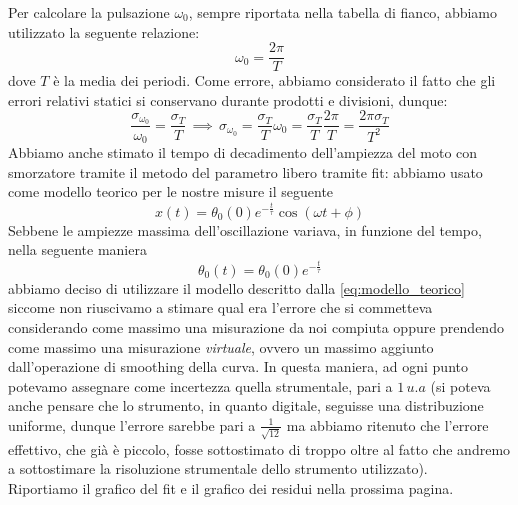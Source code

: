 \documentclass{article}
\begin{document}
\noindent Per calcolare la pulsazione $\omega_0$, sempre riportata nella tabella di fianco, abbiamo utilizzato la seguente relazione:
\begin{equation}
	\omega_0 = \frac{2\pi}{T}
\end{equation}
dove $T$ è la media dei periodi. Come errore, abbiamo considerato il fatto che gli errori relativi statici si conservano durante prodotti e divisioni, dunque:
\begin{equation*}
	\frac{\sigma_{\omega_0}}{\omega_0} = \frac{\sigma_{T}}{T} \, \implies \, \sigma_{\omega_0} = \frac{\sigma_T}{T} \omega_0 = \frac{\sigma_T}{T} \frac{2\pi}{T} = \frac{2\pi \sigma_T}{T^2}
\end{equation*}
Abbiamo anche stimato il tempo di decadimento dell'ampiezza del moto con smorzatore tramite il metodo del parametro libero tramite fit: abbiamo usato come modello teorico per le nostre misure il seguente
\begin{equation}
	x(t) = \theta_0 (0)e^{-\frac{t}{\tau}}\cos{\left( \omega t + \phi \right) }
	\label{eq:modello_teorico}
\end{equation}
Sebbene le ampiezze massima dell'oscillazione variava, in funzione del tempo, nella seguente maniera
$$
	\theta_0 (t) = \theta_0 (0) e^{-\frac{t}{\tau}}
$$
abbiamo deciso di utilizzare il modello descritto dalla \ref{eq:modello_teorico} siccome non riuscivamo a stimare qual era l'errore che si commetteva considerando come massimo una misurazione da noi compiuta oppure prendendo come massimo una misurazione \emph{virtuale}, ovvero un massimo aggiunto dall'operazione di smoothing della curva. In questa maniera, ad ogni punto potevamo assegnare come incertezza quella strumentale, pari a $1 \, u.a$ (si poteva anche pensare che lo strumento, in quanto digitale, seguisse una distribuzione uniforme, dunque l'errore sarebbe pari a $\frac{1}{\sqrt{12}}$ ma abbiamo ritenuto che l'errore effettivo, che già è piccolo, fosse sottostimato di troppo oltre al fatto che andremo a sottostimare la risoluzione strumentale dello strumento utilizzato). \\
Riportiamo il grafico del fit e il grafico dei residui nella prossima pagina.
\end{document}
